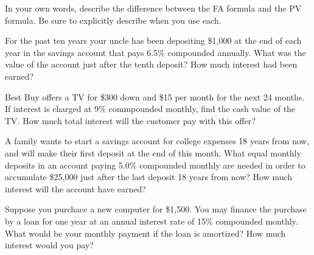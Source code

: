 \documentclass[11pt,epsfig]{article}
\begin{document}
\begin{problem}{5}
In your own words, describe the difference between the FA formula and the PV formula. Be sure to explicitly describe when you use each. 

\vfill
\end{problem}

\begin{problem}{5}
For the past ten years your uncle has been depositing \$1,000 at the end of each year in the savings account that pays 6.5\% compounded annually. What was the value of the account just after the tenth deposit? How much interest had been earned?

\vfill
\end{problem}

\newpage

\begin{problem}{5}
Best Buy offers a TV for \$300 down and \$15 per month for the next 24 months. If interest is charged at 9\% commpounded monthly, find the cash value of the TV. How much total interest will the customer pay with this offer?

\vfill
\end{problem}

\begin{problem}{5}
A family wants to start a savings account for college expenses 18 years from now, and will make their first deposit at the end of this month. What equal monthly deposits in an account paying 5.0\% compounded monthly are needed in order to accumulate \$25,000 just after the last deposit 18 years from now? How much interest will the account have earned?  

\vfill
\end{problem}

\begin{problem}{5}
Suppose you purchace a new computer for \$1,500. You may finance the purchase by a loan for one year at an annual interest rate of 15\% compounded monthly. What would be your monthly payment if the loan is amortized? How much interest would you pay?

\vfill
\end{problem}

\showpoints
\end{document}
